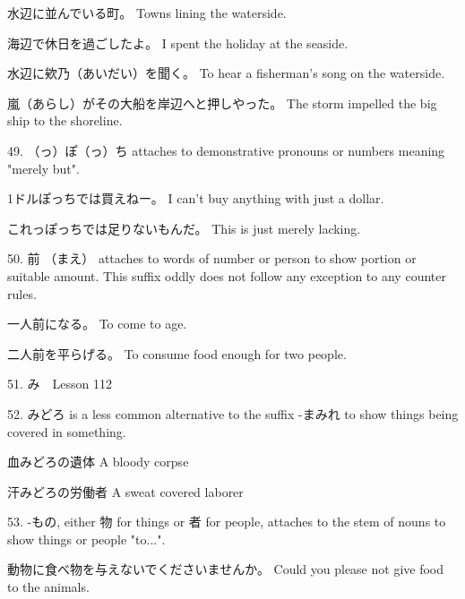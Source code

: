\par{水辺に並んでいる町。 \hfill\break
Towns lining the waterside. }

\par{海辺で休日を過ごしたよ。 \hfill\break
I spent the holiday at the seaside. }

\par{水辺に欸乃（あいだい）を聞く。 \hfill\break
To hear a fisherman's song on the waterside. }

\par{嵐（あらし）がその大船を岸辺へと押しやった。 \hfill\break
The storm impelled the big ship to the shoreline. }

\par{49. （っ）ぽ（っ）ち attaches to demonstrative pronouns or numbers meaning "merely but". }

\par{1ドルぽっちでは買えねー。 \hfill\break
I can't buy anything with just a dollar. }

\par{これっぽっちでは足りないもんだ。 \hfill\break
This is just merely lacking. }

\par{50. 前 （まえ） attaches to words of number or person to show portion or suitable amount. This suffix oddly does not follow any exception to any counter rules. }

\par{一人前になる。 \hfill\break
To come to age. }

\par{二人前を平らげる。 \hfill\break
To consume food enough for two people. }

\par{51. み　\textrightarrow  Lesson 112  }

\par{52. みどろ is a less common alternative to the suffix -まみれ to show things being covered in something. }

\par{血みどろの遺体 \hfill\break
A bloody corpse }

\par{汗みどろの労働者 \hfill\break
A sweat covered laborer }

\par{53. -もの, either 物 for things or 者 for people, attaches to the stem of nouns to show things or people "to\dothyp{}\dothyp{}\dothyp{}". }

\par{動物に食べ物を与えないでくださいませんか。 \hfill\break
Could you please not give food to the animals. }

